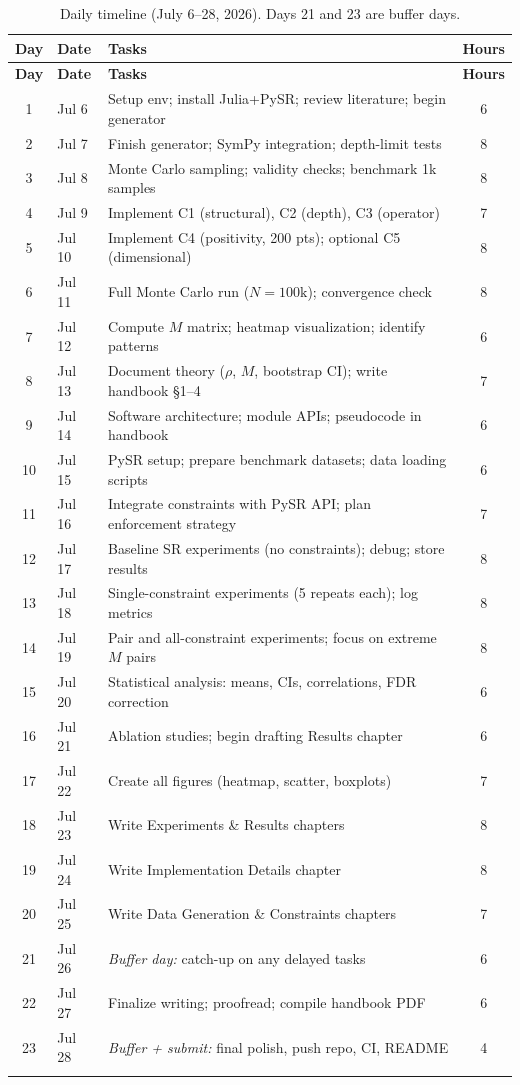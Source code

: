 \documentclass[11pt,a4paper]{article}
\begin{document}
\begin{longtable}{clp{9cm}c}
\toprule
\textbf{Day} & \textbf{Date} & \textbf{Tasks} & \textbf{Hours} \\
\midrule
\endfirsthead
\toprule
\textbf{Day} & \textbf{Date} & \textbf{Tasks} & \textbf{Hours} \\
\midrule
\endhead
1 & Jul 6 & Setup env; install Julia+PySR; review literature; begin generator & 6 \\
2 & Jul 7 & Finish generator; SymPy integration; depth-limit tests & 8 \\
3 & Jul 8 & Monte Carlo sampling; validity checks; benchmark 1k samples & 8 \\
4 & Jul 9 & Implement C1 (structural), C2 (depth), C3 (operator) & 7 \\
5 & Jul 10 & Implement C4 (positivity, 200 pts); optional C5 (dimensional) & 8 \\
6 & Jul 11 & Full Monte Carlo run ($N{=}100\text{k}$); convergence check & 8 \\
7 & Jul 12 & Compute $M$ matrix; heatmap visualization; identify patterns & 6 \\
8 & Jul 13 & Document theory ($\rho$, $M$, bootstrap CI); write handbook \S1--4 & 7 \\
9 & Jul 14 & Software architecture; module APIs; pseudocode in handbook & 6 \\
10 & Jul 15 & PySR setup; prepare benchmark datasets; data loading scripts & 6 \\
11 & Jul 16 & Integrate constraints with PySR API; plan enforcement strategy & 7 \\
12 & Jul 17 & Baseline SR experiments (no constraints); debug; store results & 8 \\
13 & Jul 18 & Single-constraint experiments (5 repeats each); log metrics & 8 \\
14 & Jul 19 & Pair and all-constraint experiments; focus on extreme $M$ pairs & 8 \\
15 & Jul 20 & Statistical analysis: means, CIs, correlations, FDR correction & 6 \\
16 & Jul 21 & Ablation studies; begin drafting Results chapter & 6 \\
17 & Jul 22 & Create all figures (heatmap, scatter, boxplots) & 7 \\
18 & Jul 23 & Write Experiments \& Results chapters & 8 \\
19 & Jul 24 & Write Implementation Details chapter & 8 \\
20 & Jul 25 & Write Data Generation \& Constraints chapters & 7 \\
21 & Jul 26 & \textit{Buffer day:} catch-up on any delayed tasks & 6 \\
22 & Jul 27 & Finalize writing; proofread; compile handbook PDF & 6 \\
23 & Jul 28 & \textit{Buffer + submit:} final polish, push repo, CI, README & 4 \\
\bottomrule
\caption{Daily timeline (July 6--28, 2026). Days 21 and 23 are buffer days.}
\end{longtable}
\end{document}
